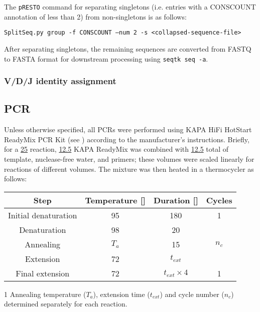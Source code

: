 
The \texttt{pRESTO} command for separating singletons (i.e. entries with a CONSCOUNT annotation of less than 2) from non-singletons is as follows:

\texttt{SplitSeq.py group -f CONSCOUNT --num 2 -s <collapsed-sequence-file>}

After separating singletons, the remaining sequences are converted from FASTQ to FASTA format for downstream processing using \texttt{seqtk seq -a}.

\subsubsection{V/D/J identity assignment}



\subsection{PCR}
\label{sec:methods_pcr}


Unless otherwise specified, all PCRs were performed using  KAPA HiFi HotStart ReadyMix PCR Kit (see ) according to the manufacturer's instructions. Briefly, for a \ul{25} reaction, \ul{12.5} KAPA ReadyMix was combined with \ul{12.5} total of template, nuclease-free water, and primers; these volumes were scaled linearly for reactions of different volumes. The mixture was then heated in a thermocycler as follows:

\begin{center}
\begin{threeparttable}
\begin{tabular}{cccc}\toprule
\textbf{Step} & \textbf{Temperature [\degC{}]} & \textbf{Duration [\secs{}]} & \textbf{Cycles}\\\midrule
Initial denaturation & 95 & 180 & 1 \\\midrule
Denaturation & 98 & 20 & \multirow{3}{*}{$n_c$\tnote{1}}\\
Annealing & $T_a$\tnote{1} \tnote{} & 15 & \\
Extension & 72 & $t_{ext}$\tnote{1} & \\\midrule
Final extension & 72 & $t_{ext} \times 4$\tnote{1} & 1\\
\end{tabular}
\begin{tablenotes}
\item[1] Annealing temperature ($T_a$), extension time ($t_{ext}$) and cycle number ($n_c$) determined separately for each reaction.
\end{tablenotes}
\end{threeparttable}
\end{center}

